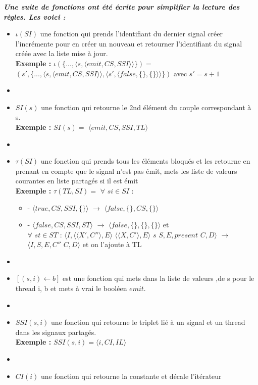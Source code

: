 \documentclass[10pt,a4paper]{article}
\begin{document}
		\textbf{\textit{Une suite de fonctions ont été écrite pour simplifier la lecture des règles. Les voici :}}
		\smallbreak
		\begin{itemize}
			\item[] $\iota(SI)$ une fonction qui prends l'identifiant du dernier signal créer l'incrémente pour en créer un nouveau et retourner l'identifiant du signal créée avec la liste mise à jour.
			\\ \textbf{Exemple :} $\iota(\{...,\langle s,\langle emit,CS,SSI\rangle\rangle\}) =$ $(s' ,\{...,\langle s,\langle emit,CS,SSI\rangle\rangle,\langle s',\langle false,\{\},\{\}\rangle\rangle\})$ avec $s' = s+1$
			\item[] 
			\item[] $SI(s)$ une fonction qui retourne le 2nd élément du couple correspondant à s.
			\\\textbf{Exemple :} $SI(s) =$ $\langle emit,CS,SSI,TL\rangle$
			\item[]  
			\item[] $\tau(SI)$ une fonction qui prends tous les éléments bloqués et les retourne en prenant en compte que le signal n'est pas émit, mets les liste de valeurs courantes en liste partagés si il est émit 
			\\ \textbf{Exemple :} $\tau(TL,SI) =$ $\forall$ $si \in SI$ : 
			\begin{itemize}
				\item[] - $\langle true,CS,SSI,\{\}\rangle$ $\rightarrow$ $\langle false,\{\},CS,\{\}\rangle$
				\item[] - $\langle false,CS,SSI,ST\rangle$ $\rightarrow$ $\langle false,\{\},\{\},\{\}\rangle$ et 
				\\$\forall$ $st \in ST$ : $\langle I,\langle\langle X',C''\rangle, E\rangle$ $\langle\langle X,C'\rangle, E\rangle$ $s$ $S,E,present$ $C,D\rangle$ $\rightarrow$ $ \langle I,S,E,C''$ $C,D\rangle$ et on l'ajoute à TL
			\end{itemize}
			\item[]
			\item[] $[(s,i) \leftarrow b]$ est une fonction qui mets dans la liste de valeurs ,de s pour le thread i, b et mets à vrai le booléen $emit$.
			\item[] 
			\item[] $SSI(s,i)$ une fonction qui retourne le triplet lié à un signal et un thread dans les signaux partagés.
			\\ \textbf{Exemple :} $SSI(s,i) = \langle i,CI,IL\rangle$
			\item[] 
			\item[] $CI(i)$ une fonction qui retourne la constante et décale l'itérateur
		\end{itemize}
		\newpage
		
\end{document}

